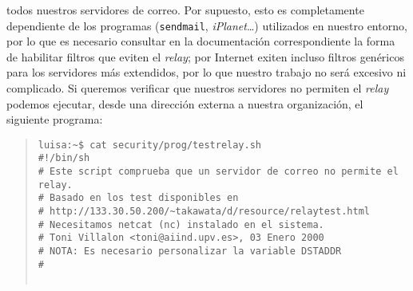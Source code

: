 todos nuestros servidores de correo. Por supuesto, esto es completamente
dependiente de los programas ({\tt sendmail}, {\it iPlanet}\ldots) utilizados en
nuestro entorno, por lo que es necesario consultar en la documentaci\'on 
correspondiente la forma de habilitar filtros que eviten el {\it relay}; por
Internet exiten incluso filtros gen\'ericos para los servidores m\'as 
extendidos, por lo que nuestro trabajo no ser\'a excesivo ni complicado. Si
queremos verificar que nuestros servidores no permiten el {\it relay} podemos
ejecutar, desde una direcci\'on externa a nuestra organizaci\'on, el siguiente
programa: 
\begin{quote}
\begin{verbatim}
luisa:~$ cat security/prog/testrelay.sh
#!/bin/sh
# Este script comprueba que un servidor de correo no permite el relay.
# Basado en los test disponibles en 
# http://133.30.50.200/~takawata/d/resource/relaytest.html
# Necesitamos netcat (nc) instalado en el sistema.
# Toni Villalon <toni@aiind.upv.es>, 03 Enero 2000
# NOTA: Es necesario personalizar la variable DSTADDR
#


\end{verbatim}
\end{quote}
